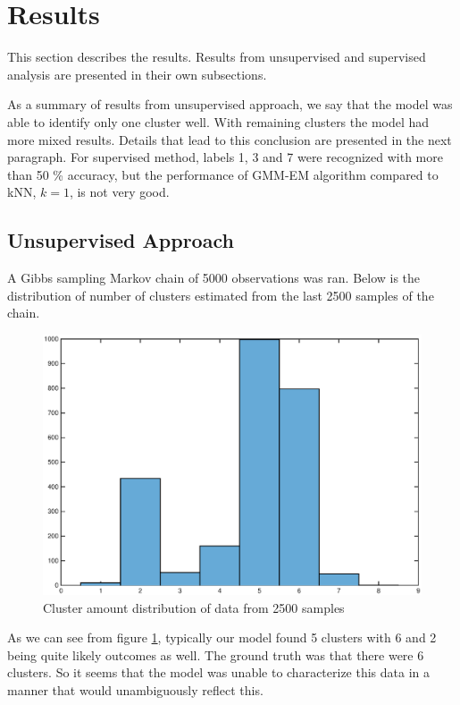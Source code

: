 \documentclass[a4paper]{article}
\begin{document}
\section{Results}

This section describes the results. Results from unsupervised and supervised analysis are presented in their own subsections.

As a summary of results from unsupervised approach, we say that the model was able to identify only one cluster well. With remaining clusters the model had more mixed results. Details that lead to this conclusion are presented in the next paragraph. For supervised method, labels 1, 3 and 7 were recognized with more than 50 \% accuracy, but the performance of GMM-EM algorithm compared to kNN, $ k = 1 $, is not very good.

\subsection{Unsupervised Approach}

\par
A Gibbs sampling Markov chain of 5000 observations was ran. Below is the distribution of number of clusters estimated from the last 2500 samples of the chain.

\begin{figure}[H]
	\includegraphics[trim={2cm 1cm 2cm 1cm},clip,scale=0.56]{k_dist_5000.eps}
	\caption{Cluster amount distribution of data from 2500 samples}
	\label{k_dist}
\end{figure}

As we can see from figure \ref{k_dist}, typically our model found 5 clusters with 6 and 2 being quite likely outcomes as well. The ground truth was that there were 6 clusters. So it seems that the model was unable to characterize this data in a manner that would  unambiguously reflect this.
\end{document}
